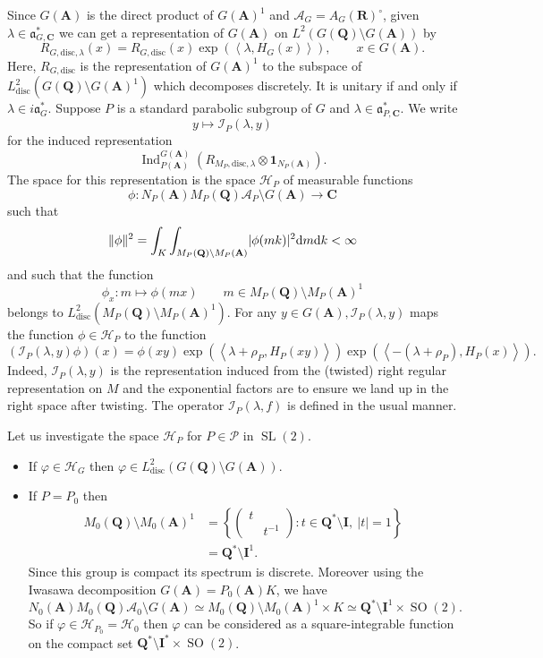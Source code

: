 \documentclass[11pt]{amsart}
\def\A{\mathbf A}
\def\C{\mathbf C}
\def\I{\mathbf I}
\def\Q{\mathbf Q}
\def\R{\mathbf R}
\def\AAA{\mathcal A}	%
\def\HHH{\mathcal H}
\def\III{\mathcal I}
\def\PPP{\mathcal P}
\def\aaa{\mathfrak a}
\def\cb#1{{\color{blue}#1}}
\def\d{\text d}
\def\bs{\setminus} 			%
\def\disc{\text{disc}}
\def\Ind{\operatorname{Ind}}
\def\Ltwo{L^2}
\def\mod#1{\lvert #1 \rvert} %
\def\norm#1{\Vert #1 \Vert} %
\def\sl{\operatorname{SL}}
\def\sprod#1#2{\left\langle #1 , #2 \right\rangle}  %
\theoremstyle{remark}
\begin{document}
Since $G(\A)$ is the direct product of $G(\A)^1$ and $\AAA_G = A_G(\R)^\circ$, given $\lambda \in \aaa_{G, \C}^*$ we can get a representation of $G(\A)$ on $\Ltwo(G(\Q) \bs G(\A))$ by
\[ R_{G, \disc, \lambda}(x) = R_{G, \disc}(x) \exp(\sprod{\lambda}{H_G(x)}), \qquad x \in G(\A). \]
Here, $R_{G, \disc}$ is the representation of $G(\A)^1$ to the subspace of $\Ltwo_\disc(G(\Q)\bs G(\A)^1)$ which decomposes discretely. It is unitary if and only if $\lambda \in i\aaa_G^*$. Suppose $P$ is a standard parabolic subgroup of $G$ and $\lambda \in \aaa_{P, \C}^*$. We write 
\[ y \mapsto \III_P(\lambda, y) \]
for the induced representation 
\[ \Ind_{P(\A)}^{G(\A)}(R_{M_P, \disc, \lambda} \otimes \mathbf 1_{N_P(\A)}). \]
The space for this representation is the space $\HHH_P$ of measurable functions
\[ \phi : N_P(\A)M_P(\Q)\AAA_P \bs G(\A) \to \C \]
such that 
\[ \norm{\phi}^2 = \int_K \int_{M_P(\Q)\bs M_P(\A)} \mod{\phi(mk)}^2 \d m \d k < \infty \]
and such that the function
\[ \phi_x : m \mapsto \phi(mx) \qquad m \in M_P(\Q)\bs M_P(\A)^1 \]
belongs to $\Ltwo_\disc(M_P(\Q) \bs M_P(\A)^1)$.
For any $y \in G(\A), \III_P(\lambda, y)$ maps the function $\phi \in \HHH_P$ to the function
\[ (\III_P(\lambda, y)\phi)(x) = \phi(xy) \exp(\sprod{\lambda + \rho_P}{H_P(xy)}) 
		\exp(\sprod{-(\lambda + \rho_P)}{H_P(x)}). \]
Indeed, $\III_P(\lambda, y)$ is the representation induced from the (twisted) right regular representation on $M$ and the exponential factors are to ensure we land up in the right space after twisting. The operator $\III_P(\lambda, f)$ is defined in the usual manner. \cb{Let us investigate the space $\HHH_P$ for $P \in \PPP$ in $\sl(2)$. 
\begin{itemize}
	\item If $\varphi \in \HHH_G$ then $\varphi \in \Ltwo_{\disc}(G(\Q)\bs G(\A))$. 
	\item If $P = P_0$ then
		\begin{align*}
			M_0(\Q)\bs M_0(\A)^1 & = \left\{ \begin{pmatrix} t & \\ & t^{-1}	\end{pmatrix} : t \in \Q^* \bs\I , \ \mod{t} = 1 \right\} \\
					& = \Q^* \bs \I^1.
 		\end{align*}
		Since this group is compact its spectrum is discrete. Moreover using the Iwasawa decomposition $G(\A) = P_0(\A) K$, we have
		\[ N_0(\A)M_0(\Q)\AAA_0\bs G(\A) \simeq M_0(\Q)\bs M_0(\A)^1 \times K \simeq \Q^*\bs \I^1 \times \operatorname{SO}(2). \]
		So if $\varphi \in \HHH_{P_0} = \HHH_0$ then $\varphi$ can be considered as a square-integrable function on the compact set $\Q^*\bs \I^* \times \operatorname{SO}(2)$. 
\end{itemize}
}
\end{document}
